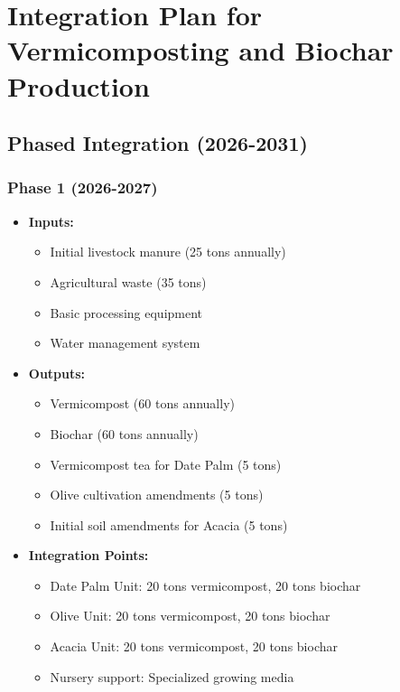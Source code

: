 \section{Integration Plan for Vermicomposting and Biochar Production}

\subsection{Phased Integration (2026-2031)}

\subsubsection{Phase 1 (2026-2027)}
\begin{itemize}
    \item \textbf{Inputs:}
    \begin{itemize}
        \item Initial livestock manure (25 tons annually)
        \item Agricultural waste (35 tons)
        \item Basic processing equipment
        \item Water management system
    \end{itemize}
    \item \textbf{Outputs:}
    \begin{itemize}
        \item Vermicompost (60 tons annually)
        \item Biochar (60 tons annually)
        \item Vermicompost tea for Date Palm (5 tons)
        \item Olive cultivation amendments (5 tons)
        \item Initial soil amendments for Acacia (5 tons)
    \end{itemize}
    \item \textbf{Integration Points:}
    \begin{itemize}
        \item Date Palm Unit: 20 tons vermicompost, 20 tons biochar
        \item Olive Unit: 20 tons vermicompost, 20 tons biochar
        \item Acacia Unit: 20 tons vermicompost, 20 tons biochar
        \item Nursery support: Specialized growing media
    \end{itemize}
\end{itemize}

